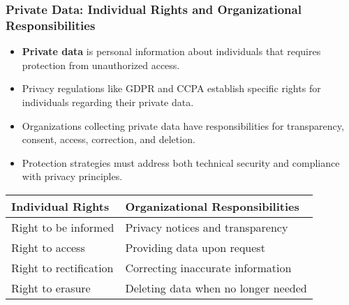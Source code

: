 \documentclass{beamer}
\begin{document}
\begin{frame}
\frametitle{Private Data: Individual Rights and Organizational Responsibilities}
\begin{itemize}
\item \textbf{Private data} is personal information about individuals that requires protection from unauthorized access.
\item Privacy regulations like GDPR and CCPA establish specific rights for individuals regarding their private data.
\item Organizations collecting private data have responsibilities for transparency, consent, access, correction, and deletion.
\item Protection strategies must address both technical security and compliance with privacy principles.
\end{itemize}

\begin{table}
\begin{tabular}{|l|l|}
\hline
\textbf{Individual Rights} & \textbf{Organizational Responsibilities} \\
\hline
Right to be informed & Privacy notices and transparency \\
\hline
Right to access & Providing data upon request \\
\hline
Right to rectification & Correcting inaccurate information \\
\hline
Right to erasure & Deleting data when no longer needed \\
\hline
\end{tabular}
\end{table}
\end{frame}
\end{document}
